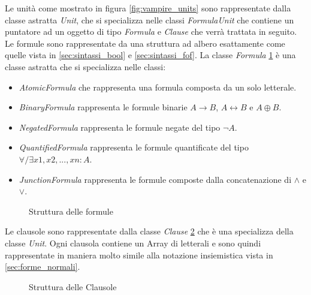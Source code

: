 \documentclass[./main.tex]{subfiles}
\begin{document}
Le unità come mostrato in figura \ref{fig:vampire_units} sono rappresentate dalla classe astratta \textit{Unit},
che si specializza nelle classi \textit{FormulaUnit} che contiene un puntatore ad un oggetto di tipo \textit{Formula}
e \textit{Clause} che verrà trattata in seguito.
Le formule sono rappresentate da una struttura ad albero esattamente come quelle vista in \ref{sec:sintassi_bool} e \ref{sec:sintassi_fof}.
La classe \textit{Formula} \ref{fig:vampire_formulas} è una classe astratta che si specializza nelle classi:
\begin{itemize}
    \item \textit{AtomicFormula} che rappresenta una formula composta da un solo letterale.
    \item \textit{BinaryFormula} rappresenta le formule binarie $A \rightarrow B$, $A \leftrightarrow B$ e $A \oplus B$.
    \item \textit{NegatedFormula} rappresenta le formule negate del tipo $\lnot A$.
    \item \textit{QuantifiedFormula} rappresenta le formule quantificate del tipo $\forall/\exists x1, x2, ..., xn : A$.
    \item \textit{JunctionFormula} rappresenta le formule composte dalla concatenazione di $\land$ e $\lor$.
\end{itemize}

\begin{figure}[H]
    \centering
    \scalebox{0.5}{
        
    }
    \caption{Struttura delle formule}
    \label{fig:vampire_formulas}
\end{figure}

Le clausole sono rappresentate dalla classe \textit{Clause} \ref{fig:vampire_clauses} che è una specializza della classe \textit{Unit}.
Ogni clausola contiene un Array di letterali e sono quindi rappresentate in maniera molto simile alla notazione insiemistica 
vista in \ref{sec:forme_normali}.

\begin{figure}[H]
    \centering
    \scalebox{0.55}{
        
    }
    
    \caption{Struttura delle Clausole}
    \label{fig:vampire_clauses}
\end{figure}
\end{document}
